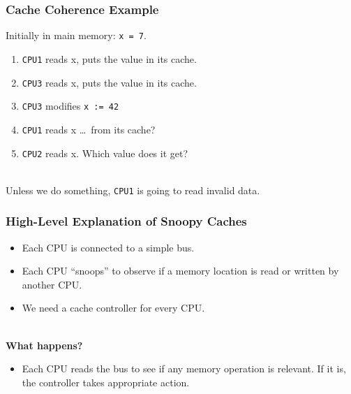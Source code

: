 \documentclass[aspectratio=43]{beamer}
\newenvironment{changemargin}[1]{%
  \begin{list}{}{%
    \setlength{\topsep}{0pt}%
    \setlength{\leftmargin}{#1}%
    \setlength{\rightmargin}{1em}
    \setlength{\listparindent}{\parindent}%
    \setlength{\itemindent}{\parindent}%
    \setlength{\parsep}{\parskip}%
  }%
  \item[]}{\end{list}}
\begin{document}
\begin{frame}
  \frametitle{Cache Coherence Example}

  \begin{changemargin}{1cm}
  Initially in main memory: {\tt x = 7}.

  \begin{enumerate}
    \item {\tt CPU1} reads x, puts the value in its cache.
    \item {\tt CPU3} reads x, puts the value in its cache.
    \item {\tt CPU3} modifies {\tt x := 42}
    \item {\tt CPU1} reads x \ldots ~from its cache?
    \item {\tt CPU2} reads x. Which value does it get?
  \end{enumerate}
  ~\\

  Unless we do something, {\tt CPU1} is going to read invalid data.
  \end{changemargin}
\end{frame}

\begin{frame}
  \frametitle{High-Level Explanation of Snoopy Caches}

  \begin{changemargin}{1cm}
  \begin{itemize}
    \item Each CPU is connected to a simple bus.
    \item Each CPU ``snoops'' to observe if a memory location is read or written
      by another CPU.
    \item We need a cache controller for every CPU.
  \end{itemize}
  ~\\
  {\bf What happens?}

  \begin{itemize}
    \item Each CPU reads the bus to see if any memory operation is relevant. If
      it is, the controller takes appropriate action.
  \end{itemize}
  \end{changemargin}
\end{frame}
\end{document}
